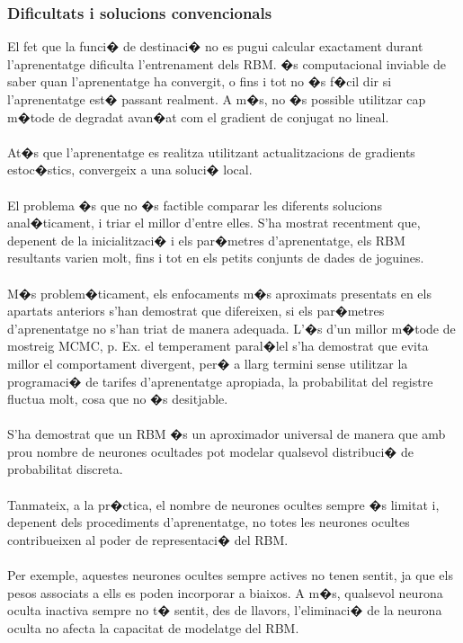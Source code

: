 \documentclass[12pt,a4paper,openright,oneside]{article}
\numberwithin{equation}{section}
\theoremstyle{definition}
\begin{document}
\subsubsection{Dificultats i solucions convencionals}
El fet que la funci� de destinaci� no es pugui calcular exactament durant l'aprenentatge dificulta l'entrenament dels RBM. �s computacional inviable de saber quan l'aprenentatge ha convergit, o fins i tot no �s f�cil dir si l'aprenentatge est� passant realment. A m�s, no �s possible utilitzar cap m�tode de degradat avan�at com el gradient de conjugat no lineal.\\\\
At�s que l'aprenentatge es realitza utilitzant actualitzacions de gradients estoc�stics, convergeix a una soluci� local.\\\\
El problema �s que no �s factible comparar les diferents solucions anal�ticament, i triar el millor d'entre elles. S'ha mostrat recentment que, depenent de la inicialitzaci� i els par�metres d'aprenentatge, els RBM resultants varien molt, fins i tot en els petits conjunts de dades de joguines.\\\\
M�s problem�ticament, els enfocaments m�s aproximats presentats en els apartats anteriors s'han demostrat que difereixen, si els par�metres d'aprenentatge no s'han triat de manera adequada. L'�s d'un millor m�tode de mostreig MCMC, p. Ex. el temperament paral�lel s'ha demostrat que evita millor el comportament divergent, per� a llarg termini sense utilitzar la programaci� de tarifes d'aprenentatge apropiada, la probabilitat del registre fluctua molt, cosa que no �s desitjable.\\\\
S'ha demostrat que un RBM �s un aproximador universal de manera que amb prou nombre de neurones ocultades pot modelar qualsevol distribuci� de probabilitat discreta.\\\\
Tanmateix, a la pr�ctica, el nombre de neurones ocultes sempre �s limitat i, depenent dels procediments d'aprenentatge, no totes les neurones ocultes contribueixen al poder de representaci� del RBM.\\\\
Per exemple, aquestes neurones ocultes sempre actives no tenen sentit, ja que els pesos associats a ells es poden incorporar a biaixos. A m�s, qualsevol neurona oculta inactiva sempre no t� sentit, des de llavors, l'eliminaci� de la neurona oculta no afecta la capacitat de modelatge del RBM.\\\\
\end{document}
